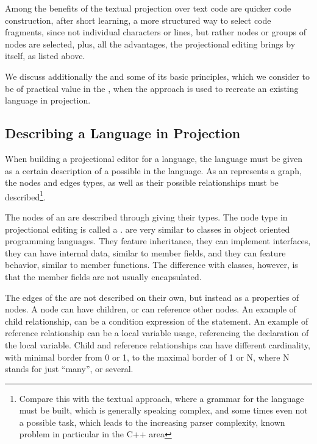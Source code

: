 Among the benefits of the textual projection over text code are quicker code construction, 
after short learning, a more structured way to select code fragments, since not individual 
characters or lines, but rather  nodes or groups of nodes are selected, 
plus, all the advantages, the projectional editing brings by itself, as listed above.

We discuss additionally the  and some of its basic 
principles, which we consider to be of practical value in the ,
when the approach is used to recreate an existing language in projection.


\subsection{Describing a Language in Projection}

When  building a projectional editor for a language, the language must be given as a certain description of a possible  in the language.
As an  represents a graph, the nodes and edges types, as well as their possible relationships must be described\footnote{Compare this
with the textual approach, where a grammar for the language must be built, which is generally speaking complex, and some times even not a
possible task, which leads to the increasing parser complexity, known problem in particular in the C++ area}. 

The nodes of an
 are described through giving their types. The node type in projectional editing is called a .  are very
similar to classes in object oriented programming languages. They feature inheritance, they can implement interfaces, they can have internal data, similar
to member fields, and they can feature behavior, similar to member functions. The difference with classes, however, is that the member fields are not 
usually encapsulated.

The edges of the  are not described on their own, but instead as a properties of nodes. A node can have children, or can reference other nodes.
An example of child relationship, can be a condition expression of the  statement. An example of reference relationship can be a local variable usage,
referencing the declaration of the local variable. Child and reference relationships can have different cardinality, with minimal border from 0 or 1, to the 
maximal border of 1 or N, where N stands for just ``many'', or several.

